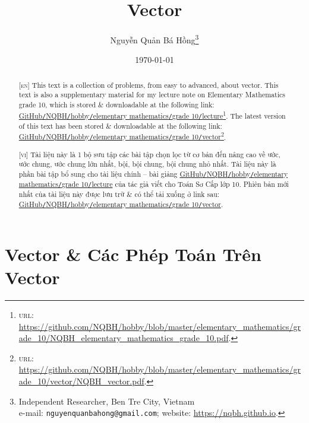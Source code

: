 \documentclass{article}
\title{Vector}
\author{Nguyễn Quản Bá Hồng\footnote{Independent Researcher, Ben Tre City, Vietnam\\e-mail: \texttt{nguyenquanbahong@gmail.com}; website: \url{https://nqbh.github.io}.}}
\date{\today}
\numberwithin{equation}{section}
\begin{document}
\maketitle
\begin{abstract}
	\textsc{[en]} This text is a collection of problems, from easy to advanced, about vector. This text is also a supplementary material for my lecture note on Elementary Mathematics grade 10, which is stored \& downloadable at the following link: \href{https://github.com/NQBH/hobby/blob/master/elementary_mathematics/grade_10/NQBH_elementary_mathematics_grade_10.pdf}{GitHub\texttt{/}NQBH\texttt{/}hobby\texttt{/}elementary mathematics\texttt{/}grade 10\texttt{/}lecture}\footnote{\textsc{url}: \url{https://github.com/NQBH/hobby/blob/master/elementary_mathematics/grade_10/NQBH_elementary_mathematics_grade_10.pdf}.}. The latest version of this text has been stored \& downloadable at the following link: \href{https://github.com/NQBH/hobby/blob/master/elementary_mathematics/grade_10/vector/NQBH_vector.pdf}{GitHub\texttt{/}NQBH\texttt{/}hobby\texttt{/}elementary mathematics\texttt{/}grade 10\texttt{/}vector}\footnote{\textsc{url}: \url{https://github.com/NQBH/hobby/blob/master/elementary_mathematics/grade_10/vector/NQBH_vector.pdf}.}.
	\vspace{2mm}
	
	\textsc{[vi]} Tài liệu này là 1 bộ sưu tập các bài tập chọn lọc từ cơ bản đến nâng cao về ước, ước chung, ước chung lớn nhất, bội, bội chung, bội chung nhỏ nhất. Tài liệu này là phần bài tập bổ sung cho tài liệu chính -- bài giảng \href{https://github.com/NQBH/hobby/blob/master/elementary_mathematics/grade_10/NQBH_elementary_mathematics_grade_10.pdf}{GitHub\texttt{/}NQBH\texttt{/}hobby\texttt{/}elementary mathematics\texttt{/}grade 10\texttt{/}lecture} của tác giả viết cho Toán Sơ Cấp lớp 10. Phiên bản mới nhất của tài liệu này được lưu trữ \& có thể tải xuống ở link sau: \href{https://github.com/NQBH/hobby/blob/master/elementary_mathematics/grade_10/vector/NQBH_vector.pdf}{GitHub\texttt{/}NQBH\texttt{/}hobby\texttt{/}elementary mathematics\texttt{/}grade 10\texttt{/}vector}.
\end{abstract}
\setcounter{secnumdepth}{4}
\setcounter{tocdepth}{3}
\tableofcontents


\section{Vector \& Các Phép Toán Trên Vector}
\end{document}
